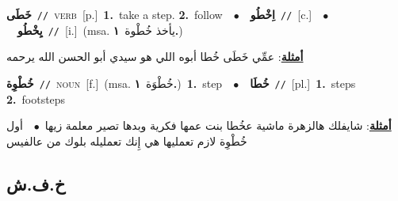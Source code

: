 \documentclass[10pt,a4paper,twoside]{article} %
\begin{document}
\begin{multicols}{2}
{\setlength\topsep{0pt}\textbf{\foreignlanguage{arabic}{خَطَى}}\ {\color{gray}\texttt{//}\color{black}}\ \textsc{verb}\ [p.]\ \textbf{1.}~take a step.  \textbf{2.}~follow\ \ $\bullet$\ \ \setlength\topsep{0pt}\textbf{\foreignlanguage{arabic}{اِخْطُو}}\ {\color{gray}\texttt{//}\color{black}}\ [c.]\ \ $\bullet$\ \ \setlength\topsep{0pt}\textbf{\foreignlanguage{arabic}{يِخْطُو}}\ {\color{gray}\texttt{//}\color{black}}\ [i.]\ \color{gray}(msa. \foreignlanguage{arabic}{يأخذ خُطْوة}~\foreignlanguage{arabic}{\textbf{١.}})\color{black}\  \begin{flushright}\color{gray}\foreignlanguage{arabic}{\textbf{\underline{\foreignlanguage{arabic}{أمثلة}}}: عمِّي خَطَى خُطا أبوه اللي هو سيدي أبو الحسن الله يرحمه}\end{flushright}\color{black}} \vspace{2mm}

{\setlength\topsep{0pt}\textbf{\foreignlanguage{arabic}{خُطْوِة}}\ {\color{gray}\texttt{//}\color{black}}\ \textsc{noun}\ [f.]\ \color{gray}(msa. \foreignlanguage{arabic}{خُطْوَة}~\foreignlanguage{arabic}{\textbf{١.}})\color{black}\ \textbf{1.}~step\ \ $\bullet$\ \ \setlength\topsep{0pt}\textbf{\foreignlanguage{arabic}{خُطَا}}\ {\color{gray}\texttt{//}\color{black}}\ [pl.]\ \textbf{1.}~steps  \textbf{2.}~footsteps\  \begin{flushright}\color{gray}\foreignlanguage{arabic}{\textbf{\underline{\foreignlanguage{arabic}{أمثلة}}}: شايفلك هالزهرة ماشية عخُطا بنت عمها فكرية وبدها تصير معلمة زيها\ $\bullet$\ \  أول خُطْوِة لازم تعمليها هي إِنك تعمليله بلوك من عالفيس}\end{flushright}\color{black}} \vspace{2mm}

\vspace{-3mm}
\subsection*{\color{blue}\foreignlanguage{arabic}{خ.ف.ش}\color{blue}{}} 


\end{multicols}
\end{document}
